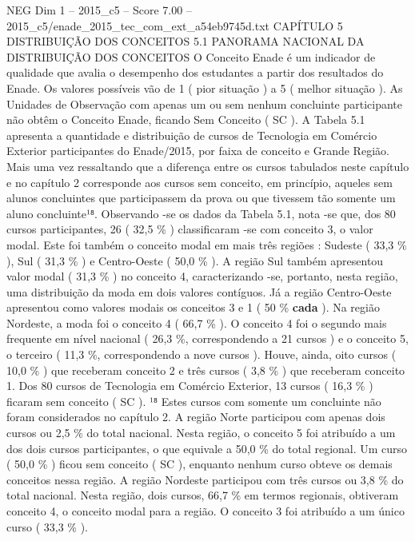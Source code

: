 \begin{textsample}{NEG Dim 1 – 2015\_c5 – Score 7.00 – 2015\_c5/enade\_2015\_tec\_com\_ext\_a54eb9745d.txt}  \label{ex:f1_neg_348}
CAPÍTULO 5 DISTRIBUIÇÃO DOS CONCEITOS 5.1 PANORAMA NACIONAL DA DISTRIBUIÇÃO DOS CONCEITOS O Conceito Enade é um indicador de qualidade que avalia o desempenho dos estudantes a partir dos resultados do Enade.
Os valores possíveis vão de 1 ( pior situação ) a 5 ( melhor situação ).
As Unidades de Observação com apenas um ou sem nenhum concluinte participante não obtêm o Conceito Enade, ficando Sem Conceito ( SC ).
A Tabela 5.1 apresenta a quantidade e distribuição de cursos de Tecnologia em Comércio Exterior participantes do Enade/2015, por faixa de conceito e Grande Região.
Mais uma vez ressaltando que a diferença entre os cursos tabulados neste capítulo e no capítulo 2 corresponde aos cursos sem conceito, em princípio, aqueles sem alunos concluintes que participassem da prova ou que tivessem tão somente um aluno concluinte¹⁸.
Observando -se os dados da Tabela 5.1, nota -se que, dos 80 cursos participantes, 26 ( 32,5 \% ) classificaram -se com conceito 3, o valor modal.
Este foi também o conceito modal em mais três regiões : Sudeste ( 33,3 \% ), Sul ( 31,3 \% ) e Centro-Oeste ( 50,0 \% ).
A região Sul também apresentou valor modal ( 31,3 \% ) no conceito 4, caracterizando -se, portanto, nesta região, uma distribuição da moda em dois valores contíguos.
Já a região Centro-Oeste apresentou como valores modais os conceitos 3 e 1 ( 50 \% \textbf{cada} ).
Na região Nordeste, a moda foi o conceito 4 ( 66,7 \% ).
O conceito 4 foi o segundo mais frequente em nível nacional ( 26,3 \%, correspondendo a 21 cursos ) e o conceito 5, o terceiro ( 11,3 \%, correspondendo a nove cursos ).
Houve, ainda, oito cursos ( 10,0 \% ) que receberam conceito 2 e três cursos ( 3,8 \% ) que receberam conceito 1.
Dos 80 cursos de Tecnologia em Comércio Exterior, 13 cursos ( 16,3 \% ) ficaram sem conceito ( SC ). ¹⁸ Estes cursos com somente um concluinte não foram considerados no capítulo 2.
A região Norte participou com apenas dois cursos ou 2,5 \% do total nacional.
Nesta região, o conceito 5 foi atribuído a um dos dois cursos participantes, o que equivale a 50,0 \% do total regional.
Um curso ( 50,0 \% ) ficou sem conceito ( SC ), enquanto nenhum curso obteve os demais conceitos nessa região.
A região Nordeste participou com três cursos ou 3,8 \% do total nacional.
Nesta região, dois cursos, 66,7 \% em termos regionais, obtiveram conceito 4, o conceito modal para a região.
O conceito 3 foi atribuído a um único curso ( 33,3 \% ).

\end{textsample}
